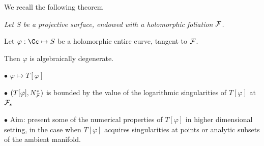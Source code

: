 
\begin{slide}

\par{}
\par\vspace{\bigskipamount}\noindent
\par\noindent We recall the following theorem
\vskip 0.3cm

{\sl Let $S$ be a projective surface,
endowed with a holomorphic foliation ${\cal F}$. 

Let $\varphi:{\Cc} \mapsto S$ be a holomorphic entire curve, tangent to ${\cal F}$.

Then $\varphi$ is algebraically degenerate.}


\vskip 0.5cm

$\bullet$ $\varphi \mapsto T[\varphi]$

\vskip 3pt

$\bullet$ $(T[\varphi], N_{\cal F}^*)$ is bounded by the value of the 
logarithmic singularities of 
 $T[\varphi]$ at ${\cal F}_s$

\vskip 3pt

$\bullet$ Aim: present some of the numerical properties of $T[\varphi]$ in higher 
dimensional setting, in the \vskip 0cm
\hskip 0.3cm case when $T[\varphi]$ acquires 
singularities at points or analytic subsets
of the ambient manifold.
\end{slide}




